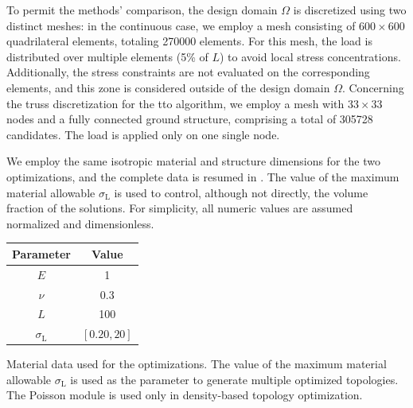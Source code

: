 To permit the methods' comparison, the design domain $\Omega$ is discretized using two distinct meshes: in the continuous case, we employ a mesh consisting of $600\times600$ quadrilateral elements, totaling \num[group-separator={$\,$}]{270000} elements. For this mesh, the load is distributed over multiple elements (5\% of $L$) to avoid local stress concentrations. Additionally, the stress constraints are not evaluated on the corresponding elements, and this zone is considered outside of the design domain $\Omega$. Concerning the truss discretization for the \gls{tto} algorithm, we employ a mesh with $33\times 33$ nodes and a fully connected ground structure, comprising a total of \num[group-separator={$\,$}]{305728} candidates. The load is applied only on one single node.

We employ the same isotropic material and structure dimensions for the two optimizations, and the complete data is resumed in . The value of the maximum material allowable $\sigma_\text{L}$ is used to control, although not directly, the volume fraction of the solutions. For simplicity, all numeric values are assumed normalized and dimensionless.

\begin{margintable}
    \small
    \centering
    \begin{tabular}{cc}
    \toprule
    \textbf{Parameter}        & \textbf{Value} \\ \midrule
    $E$              & 1     \\
    $\nu$            & 0.3   \\
    $L$              & 100   \\
    $\sigma_\text{L}$ & $[0.20,20]$ \\
    \bottomrule
    \end{tabular}
    \caption{Material data used for the optimizations. The value of the maximum material allowable $\sigma_\text{L}$ is used as the parameter to generate multiple optimized topologies. The Poisson module is used only in density-based topology optimization.}
    \label{tab:03_mat}
\end{margintable}

